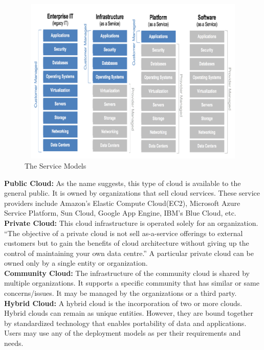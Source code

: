 \begin{figure}[htb]
\centering
\includegraphics[width=12cm,height=8cm]{5-contents/1-Introduction/images/service-model.png} %
\caption{The Service Models}
\label{fig:label} %
\end{figure}

\textbf{Public Cloud:} {As the name suggests, this type of cloud is available to the general public. It is owned by organizations that sell cloud services. These service providers include Amazon’s Elastic Compute Cloud(EC2), Microsoft Azure Service Platform, Sun Cloud, Google App Engine, IBM’s Blue Cloud, etc.}\\
\textbf{Private Cloud:} {This cloud infrastructure is operated solely for an organization. “The objective of a private cloud is not sell as-a-service offerings to external customers but to gain the benefits of cloud architecture without giving up the control of maintaining your own data centre.” A particular private cloud can be owned only by a single entity or organization.}\\
\textbf{Community Cloud:} {The infrastructure of the community cloud is shared by multiple organizations. It supports a specific community that has similar or same concerns/issues. It may be managed by the organizations or a third party.}\\
\textbf{Hybrid Cloud:} {A hybrid cloud is the incorporation of two or more clouds. Hybrid clouds can remain as unique entities. However, they are bound together by standardized technology that enables portability of data and applications.}
Users may use any of the deployment models as per their requirements and needs.

